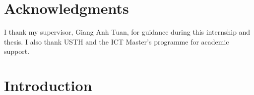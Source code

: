 \documentclass[12pt, a4paper]{report}
\begin{document}


\begin{abstract}
This thesis studies content-level detection of COVID-19 / vaccine misinformation with Transformers, then maps themes in labelled false documents with BERTopic.
On CONSTRAINT, RoBERTa reaches macro-F1~$0.9719$ (TF--IDF baseline~$0.9224$).
On MMCoVaR news, a \emph{label-stratified} ablation looks very strong (text~$0.9630$, fusion~$0.9632$, image~$0.5542$), but an audit shows $99.4\%$ of test articles share a publisher with train.
We therefore retrain the same three models under a \emph{publisher-disjoint} protocol (overlap~$0\%$): macro-F1 drops to text~$0.4398$, image~$0.4887$, fusion~$0.5192$.
That collapse is the central scientific finding: high scores under the original split largely reflect source leakage, not robust claim-level detection.
Data are English pandemic-period resources (2020--2021); live TikTok/X crawling and Whisper audio remain future work.
\end{abstract}

\clearpage


\chapter*{Acknowledgments}

I thank my supervisor, Giang Anh Tuan, for guidance during this internship and thesis.
I also thank USTH and the ICT Master's programme for academic support.

\clearpage


\tableofcontents

\clearpage

\setcounter{page}{1}


\chapter{Introduction}
\label{chap:introduction}
\end{document}
